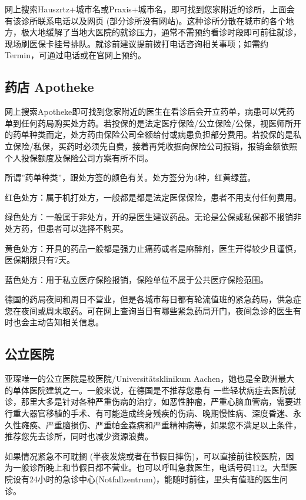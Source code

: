     网上搜索Hauszrtz+城市名或Praxis+城市名，即可找到您家附近的诊所，上面会有该诊所联系电话以及网页 (部分诊所没有网站)。这种诊所分散在城市的各个地方，极大地缓解了当地大医院的就诊压力，通常不需预约看诊时段即可前往就诊，现场刷医保卡挂号排队。就诊前建议提前拨打电话咨询相关事项；如需约Termin，可通过电话或在官网上预约。

  \subsection{药店 Apotheke}\label{subsec:药店 Apotheke}

    网上搜索Apotheke即可找到您家附近的医生在看诊后会开立药单，病患可以凭药单到任何药局购买处方药。若投保的是法定医疗保险/公立保险/公保，视医师所开的药单种类而定，处方药由保险公司全额给付或病患负担部分费用。若投保的是私立保险/私保，买药时必须先自费，接着再凭收据向保险公司报销，报销金额依照个人投保额度及保险公司方案有所不同。

    所谓”药单种类”，跟处方签的颜色有关。处方签分为4种，红黄绿蓝。

    红色处方：属于机打处方，一般都是都是法定医保保险，患者不用支付任何费用。

    绿色处方：一般属于非处方，开的是医生建议药品。无论是公保或私保都不报销非处方药，但患者可以选择不购买。

    黄色处方：开具的药品一般都是强力止痛药或者是麻醉剂，医生开得较少且谨慎，医保期限只有7天。

    蓝色处方：用于私立医疗保险报销，保险单位不属于公共医疗保险范围。

    德国的药局夜间和周日不营业，但是各城市每日都有轮流值班的紧急药局，供急症您在夜间或周末取药。可在网上查询当日有哪些紧急药局开门，夜间急诊的医生有时也会主动告知相关信息。

  \subsection{公立医院}\label{subsec:公立医院}

    亚琛唯一的公立医院是校医院/Universitätsklinikum Aachen，她也是全欧洲最大的单体医院建筑之一。一般来说，在德国是不推荐您患有 一些轻状病症去医院就诊，那里大多是针对各种严重伤病的治疗，如恶性肿瘤，严重心脑血管病，需要进行重大器官移植的手术、有可能造成终身残疾的伤病、晚期慢性病、深度昏迷、永久性瘫痪、严重脑损伤、严重帕金森病和严重精神病等，如果您不满足以上条件，推荐您先去诊所，同时也减少资源浪费。

    如果情况紧急不可耽搁 (半夜发烧或者在节假日摔伤)，可以直接前往校医院，因为一般诊所晚上和节假日都不营业。也可以呼叫急救医生，电话号码112。大型医院设有24小时的急诊中心(Notfallzentrum)，能随时前往，里头有值班的医生问诊。


